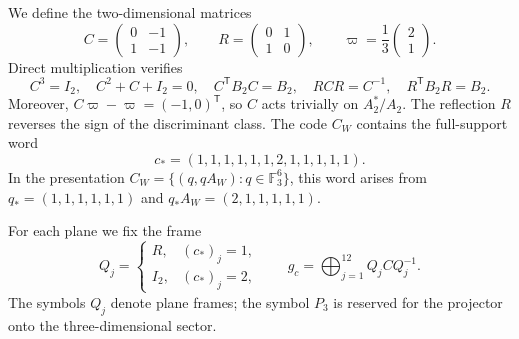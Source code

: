 We define the two-dimensional matrices
\[
 C=\begin{pmatrix}0&-1\\1&-1\end{pmatrix},
 \qquad
 R=\begin{pmatrix}0&1\\1&0\end{pmatrix},
 \qquad
 \varpi=\frac13\begin{pmatrix}2\\1\end{pmatrix}.
\]
Direct multiplication verifies
\[
 C^3=I_2,\quad C^2+C+I_2=0,\quad
 C^{\mathsf T}B_2C=B_2,\quad
 RCR=C^{-1},\quad R^{\mathsf T}B_2R=B_2.
\]
Moreover, \(C\varpi-\varpi=(-1,0)^{\mathsf T}\), so \(C\)
acts trivially on \(A_2^*/A_2\). The reflection \(R\) reverses the sign
of the discriminant class. The code \(C_W\) contains the full-support
word
\[
 c_*=(1,1,1,1,1,1,2,1,1,1,1,1).
\]
In the presentation \(C_W=\{(q,qA_W):q\in\mathbb F_3^6\}\), this
word arises from \(q_*=(1,1,1,1,1,1)\) and
\(q_*A_W=(2,1,1,1,1,1)\).

For each plane we fix the frame
\begin{equation}
 Q_j=\begin{cases}
 R,&(c_*)_j=1,\\
 I_2,&(c_*)_j=2,
 \end{cases}
 \qquad
 g_c=\bigoplus_{j=1}^{12}Q_jCQ_j^{-1}.
 \label{eq:leech-c3}
\end{equation}
The symbols \(Q_j\) denote plane frames; the symbol \(P_3\)
is reserved for the projector onto the three-dimensional sector.

